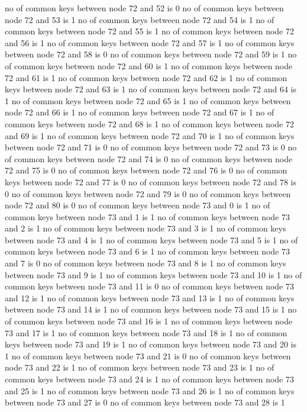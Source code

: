 no of common keys between node 72 and 52 is 0
no of common keys between node 72 and 53 is 1
no of common keys between node 72 and 54 is 1
no of common keys between node 72 and 55 is 1
no of common keys between node 72 and 56 is 1
no of common keys between node 72 and 57 is 1
no of common keys between node 72 and 58 is 0
no of common keys between node 72 and 59 is 1
no of common keys between node 72 and 60 is 1
no of common keys between node 72 and 61 is 1
no of common keys between node 72 and 62 is 1
no of common keys between node 72 and 63 is 1
no of common keys between node 72 and 64 is 1
no of common keys between node 72 and 65 is 1
no of common keys between node 72 and 66 is 1
no of common keys between node 72 and 67 is 1
no of common keys between node 72 and 68 is 1
no of common keys between node 72 and 69 is 1
no of common keys between node 72 and 70 is 1
no of common keys between node 72 and 71 is 0
no of common keys between node 72 and 73 is 0
no of common keys between node 72 and 74 is 0
no of common keys between node 72 and 75 is 0
no of common keys between node 72 and 76 is 0
no of common keys between node 72 and 77 is 0
no of common keys between node 72 and 78 is 0
no of common keys between node 72 and 79 is 0
no of common keys between node 72 and 80 is 0
no of common keys between node 73 and 0 is 1
no of common keys between node 73 and 1 is 1
no of common keys between node 73 and 2 is 1
no of common keys between node 73 and 3 is 1
no of common keys between node 73 and 4 is 1
no of common keys between node 73 and 5 is 1
no of common keys between node 73 and 6 is 1
no of common keys between node 73 and 7 is 0
no of common keys between node 73 and 8 is 1
no of common keys between node 73 and 9 is 1
no of common keys between node 73 and 10 is 1
no of common keys between node 73 and 11 is 0
no of common keys between node 73 and 12 is 1
no of common keys between node 73 and 13 is 1
no of common keys between node 73 and 14 is 1
no of common keys between node 73 and 15 is 1
no of common keys between node 73 and 16 is 1
no of common keys between node 73 and 17 is 1
no of common keys between node 73 and 18 is 1
no of common keys between node 73 and 19 is 1
no of common keys between node 73 and 20 is 1
no of common keys between node 73 and 21 is 0
no of common keys between node 73 and 22 is 1
no of common keys between node 73 and 23 is 1
no of common keys between node 73 and 24 is 1
no of common keys between node 73 and 25 is 1
no of common keys between node 73 and 26 is 1
no of common keys between node 73 and 27 is 0
no of common keys between node 73 and 28 is 1
